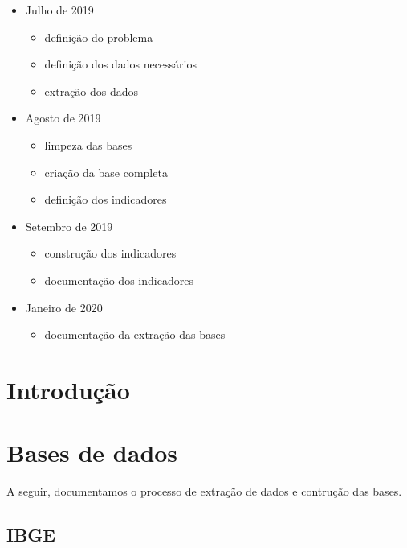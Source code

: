 \documentclass[]{book}
\providecommand{\tightlist}{%
  \setlength{\itemsep}{0pt}\setlength{\parskip}{0pt}}
\begin{document}
\begin{itemize}
\tightlist
\item
  Julho de 2019

  \begin{itemize}
  \tightlist
  \item
    definição do problema
  \item
    definição dos dados necessários
  \item
    extração dos dados
  \end{itemize}
\item
  Agosto de 2019

  \begin{itemize}
  \tightlist
  \item
    limpeza das bases
  \item
    criação da base completa
  \item
    definição dos indicadores
  \end{itemize}
\item
  Setembro de 2019

  \begin{itemize}
  \tightlist
  \item
    construção dos indicadores
  \item
    documentação dos indicadores
  \end{itemize}
\item
  Janeiro de 2020

  \begin{itemize}
  \tightlist
  \item
    documentação da extração das bases
  \end{itemize}
\end{itemize}

\hypertarget{introduuxe7uxe3o}{%
\chapter{Introdução}\label{introduuxe7uxe3o}}

\hypertarget{bases-de-dados}{%
\chapter{Bases de dados}\label{bases-de-dados}}

A seguir, documentamos o processo de extração de dados e contrução das bases.

\hypertarget{ibge}{%
\section{IBGE}\label{ibge}}
\end{document}
